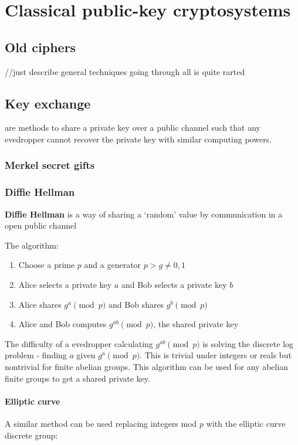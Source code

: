 \documentclass{report}
\begin{document}
\part{Classical public-key cryptosystems}
\chapter{Old ciphers}
//just describe general techniques going through all is quite rarted
\chapter{Key exchange}
 are methods to share a private key over a public channel such that any evedropper cannot recover the private key with similar computing powers.

\section{Merkel secret gifts}

\section{Diffie Hellman}

\textbf{Diffie Hellman} is a way of sharing a `random' value by communication in a open public channel

The algorithm:

\begin{enumerate}
	\item Choose a prime $p$ and a generator $p>g\neq0,1$
	\item Alice selects a private key $a$ and Bob selects a private key $b$
	\item Alice shares $g^a\pmod p$ and Bob shares $g^b\pmod p$
	\item Alice and Bob computes $g^{ab}\pmod p$, the shared private key
\end{enumerate}

The difficulty of a evedropper calculating $g^{ab}\pmod p$ is solving the discrete log problem - finding $a$ given $g^a\pmod p$. This is trivial under integers or reals but nontrivial for finite abelian groups. This algorithm can be used for any abelian finite groups to get a shared private key.

\subsection{Elliptic curve}
A similar method can be used replacing integers mod $p$ with the elliptic curve discrete group:
\end{document}
